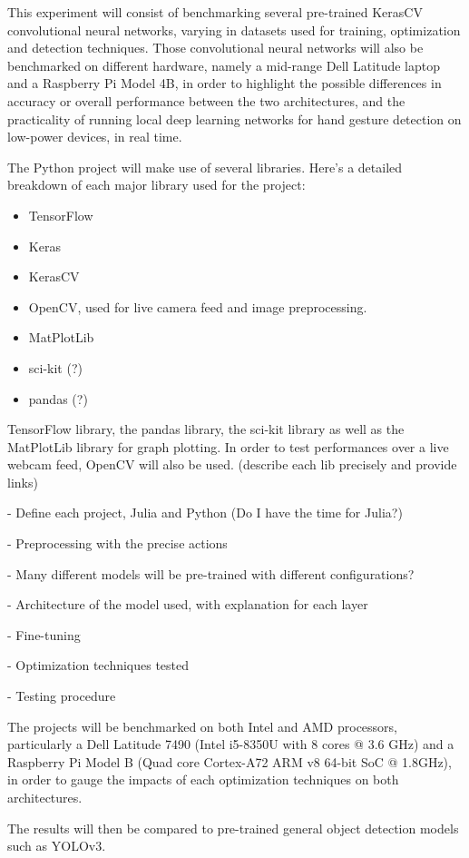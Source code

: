 \documentclass[12pt]{article}
\begin{document}
This experiment will consist of benchmarking several pre-trained KerasCV convolutional neural networks, varying in datasets used for training, optimization and detection techniques. Those convolutional neural networks will also be benchmarked on different hardware, namely a mid-range Dell Latitude laptop and a Raspberry Pi Model 4B, in order to highlight the possible differences in accuracy or overall performance between the two architectures, and the practicality of running local deep learning networks for hand gesture detection on low-power devices, in real time.

The Python project will make use of several libraries. Here's a detailed breakdown of each major library used for the project:
\begin{itemize}
  \item TensorFlow
  \item Keras
  \item KerasCV
  \item OpenCV, used for live camera feed and image preprocessing.
  \item MatPlotLib
  \item sci-kit (?)
  \item pandas (?)
\end{itemize}

TensorFlow library, the pandas library, the sci-kit library as well as the MatPlotLib library for graph plotting. In order to test performances over a live webcam feed, OpenCV will also be used.
(describe each lib precisely and provide links)

- Define each project, Julia and Python (Do I have the time for Julia?)

- Preprocessing with the precise actions

- Many different models will be pre-trained with different configurations?

- Architecture of the model used, with explanation for each layer

- Fine-tuning

- Optimization techniques tested

- Testing procedure

The projects will be benchmarked on both Intel and AMD processors, particularly a Dell Latitude 7490 (Intel i5-8350U with 8 cores @ 3.6 GHz) and a Raspberry Pi Model B (Quad core Cortex-A72 ARM v8 64-bit SoC @ 1.8GHz), in order to gauge the impacts of each optimization techniques on both architectures.

The results will then be compared to pre-trained general object detection models such as YOLOv3.
\end{document}
